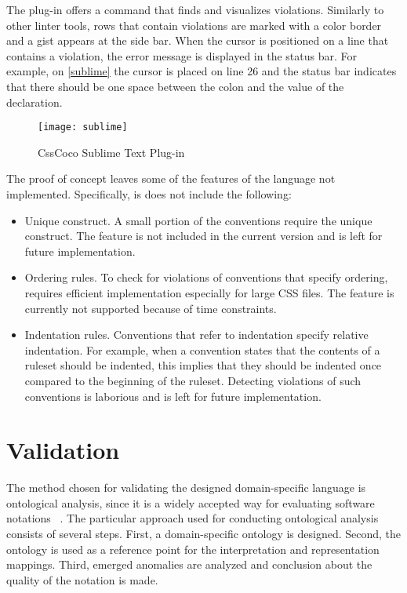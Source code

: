 The plug-in offers a command that finds and visualizes violations. Similarly to
other linter tools, rows that contain violations are marked with a color
border and a gist appears at the side bar. When the cursor is positioned on a
line that contains a violation, the error message is displayed in the status
bar. For example, on \autoref{sublime} the cursor is placed on line 26 and the
status bar indicates that there should be one space between the colon and the
value of the declaration.

\begin{figure}[h]
  \centering
  \caption{
    \label{sublime}
    CssCoco Sublime Text Plug-in}
  \texttt{[image: sublime]}
\end{figure}

The proof of concept leaves some of the features of the language not implemented. Specifically, is does not include the following:

\begin{itemize}

\item Unique construct. A small portion of the conventions require the unique construct. The feature is not included in the current version and is left for future implementation.

\item Ordering rules. To check for violations of conventions that specify ordering, requires efficient implementation especially for large CSS files. The feature is currently not supported because of time constraints. 

\item Indentation rules. Conventions that refer to indentation specify relative indentation. For example, when a convention states that the contents of a ruleset should be indented, this implies that they should be indented once compared to the beginning of the ruleset. Detecting violations of such conventions is laborious and is left for future implementation.


\end{itemize}

\section{Validation}

The method chosen for validating the designed domain-specific language is
ontological analysis, since it is a widely accepted way for evaluating
software notations
~\cite{opdahl2002ontological,green2000integrated,moody2009physics,parsons1997using,weber1996analytical}.
The particular approach used for conducting ontological analysis consists of
several steps. First, a domain-specific ontology is designed. Second, the
ontology is used as a reference point for the interpretation and
representation mappings. Third, emerged anomalies are analyzed and conclusion
about the quality of the notation is made.

